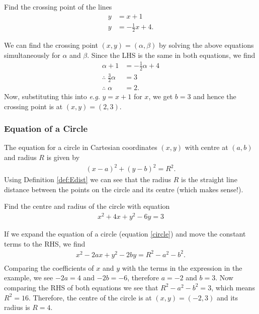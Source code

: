 \begin{example}[Lecture]
Find the crossing point of the lines
\begin{align*}
    y &= x + 1 \\
    y &= -\frac{1}{2}x + 4. 
\end{align*}
\end{example}
\begin{solution}
We can find the crossing point $(x,y) = (\alpha, \beta)$ by solving the above equations simultaneously for $\alpha$ and $\beta$. Since the LHS is the same in both equations, we find
\begin{align*}
\alpha + 1 &= -\frac{1}{2} \alpha + 4 \\
\therefore \; \frac{3}{2} \alpha &= 3 \\
\therefore \; \alpha &= 2.
\end{align*}
Now, substituting this into \textit{e.g.} $y = x + 1$ for $x$, we get $b = 3$ and hence the crossing point is at $(x,y) = (2,3)$.
\end{solution}

\subsubsection{Equation of a Circle}

The equation for a circle in Cartesian coordinates $(x,y)$ with centre at $(a,b)$ and radius $R$ is given by
\begin{align}
    \label{circle} (x - a)^2 + (y-b)^2 = R^2.
\end{align}
Using Definition \ref{def:Edist} we can see that the radius $R$ is the straight line distance between the points on the circle and its centre (which makes sense!). %

\begin{example}[Lecture]
    Find the centre and radius of the circle with equation
    \begin{align*}
        x^2 + 4x + y^2 - 6y = 3
    \end{align*}
\end{example}
\begin{solution}
If we expand the equation of a circle (equation \eqref{circle}) and move the constant terms to the RHS, we find
\begin{align*}
    x^2 - 2ax + y^2 - 2by = R^2 - a^2 - b^2. \\ 
\end{align*}
Comparing the coefficients of $x$ and $y$ with the terms in the expression in the example, we see $-2a=4$ and $-2b=-6$, therefore $a=-2$ and $b=3$. Now comparing the RHS of both equations we see that $R^2-a^2-b^2=3$, which means $R^2 = 16$. Therefore, the centre of the circle is at $(x,y) = (-2,3)$ and its radius is $R=4$. 
\end{solution}

